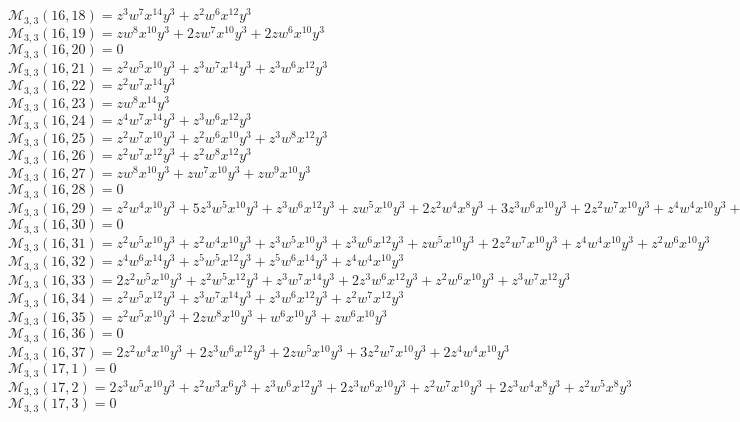\documentclass[12pt]{memoireuqam1.3}
\begin{document}
$\mathcal{M}_{3,3}(16,18)=z^3w^7x^{14}y^3+z^2w^6x^{12}y^3$\\
$\mathcal{M}_{3,3}(16,19)=zw^8x^{10}y^3+2zw^7x^{10}y^3+2zw^6x^{10}y^3$\\
$\mathcal{M}_{3,3}(16,20)=0$\\
$\mathcal{M}_{3,3}(16,21)=z^2w^5x^{10}y^3+z^3w^7x^{14}y^3+z^3w^6x^{12}y^3$\\
$\mathcal{M}_{3,3}(16,22)=z^2w^7x^{14}y^3$\\
$\mathcal{M}_{3,3}(16,23)=zw^8x^{14}y^3$\\
$\mathcal{M}_{3,3}(16,24)=z^4w^7x^{14}y^3+z^3w^6x^{12}y^3$\\
$\mathcal{M}_{3,3}(16,25)=z^2w^7x^{10}y^3+z^2w^6x^{10}y^3+z^3w^8x^{12}y^3$\\
$\mathcal{M}_{3,3}(16,26)=z^2w^7x^{12}y^3+z^2w^8x^{12}y^3$\\
$\mathcal{M}_{3,3}(16,27)=zw^8x^{10}y^3+zw^7x^{10}y^3+zw^9x^{10}y^3$\\
$\mathcal{M}_{3,3}(16,28)=0$\\
$\mathcal{M}_{3,3}(16,29)=z^2w^4x^{10}y^3+5z^3w^5x^{10}y^3+z^3w^6x^{12}y^3+zw^5x^{10}y^3+2z^2w^4x^8y^3+3z^3w^6x^{10}y^3+2z^2w^7x^{10}y^3+z^4w^4x^{10}y^3+z^2w^5x^8y^3$\\
$\mathcal{M}_{3,3}(16,30)=0$\\
$\mathcal{M}_{3,3}(16,31)=z^2w^5x^{10}y^3+z^2w^4x^{10}y^3+z^3w^5x^{10}y^3+z^3w^6x^{12}y^3+zw^5x^{10}y^3+2z^2w^7x^{10}y^3+z^4w^4x^{10}y^3+z^2w^6x^{10}y^3$\\
$\mathcal{M}_{3,3}(16,32)=z^4w^6x^{14}y^3+z^5w^5x^{12}y^3+z^5w^6x^{14}y^3+z^4w^4x^{10}y^3$\\
$\mathcal{M}_{3,3}(16,33)=2z^2w^5x^{10}y^3+z^2w^5x^{12}y^3+z^3w^7x^{14}y^3+2z^3w^6x^{12}y^3+z^2w^6x^{10}y^3+z^3w^7x^{12}y^3$\\
$\mathcal{M}_{3,3}(16,34)=z^2w^5x^{12}y^3+z^3w^7x^{14}y^3+z^3w^6x^{12}y^3+z^2w^7x^{12}y^3$\\
$\mathcal{M}_{3,3}(16,35)=z^2w^5x^{10}y^3+2zw^8x^{10}y^3+w^6x^{10}y^3+zw^6x^{10}y^3$\\
$\mathcal{M}_{3,3}(16,36)=0$\\
$\mathcal{M}_{3,3}(16,37)=2z^2w^4x^{10}y^3+2z^3w^6x^{12}y^3+2zw^5x^{10}y^3+3z^2w^7x^{10}y^3+2z^4w^4x^{10}y^3$\\
$\mathcal{M}_{3,3}(17,1)=0$\\
$\mathcal{M}_{3,3}(17,2)=2z^3w^5x^{10}y^3+z^2w^3x^6y^3+z^3w^6x^{12}y^3+2z^3w^6x^{10}y^3+z^2w^7x^{10}y^3+2z^3w^4x^8y^3+z^2w^5x^8y^3$\\
$\mathcal{M}_{3,3}(17,3)=0$\\
\end{document}
